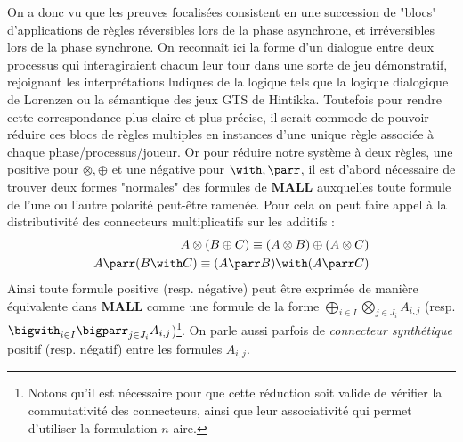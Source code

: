 \documentclass[12pt]{report}
\begin{document}
On a donc vu que les preuves focalisées consistent en une succession de "blocs" d'applications de règles réversibles lors de la phase asynchrone, et irréversibles lors de la phase synchrone. On reconnaît ici la forme d'un dialogue entre deux processus qui interagiraient chacun leur tour dans une sorte de jeu démonstratif, rejoignant les interprétations ludiques de la logique tels que la logique dialogique de Lorenzen ou la sémantique des jeux GTS de Hintikka. Toutefois pour rendre cette correspondance plus claire et plus précise, il serait commode de pouvoir réduire ces blocs de règles multiples en instances d'une unique règle associée à chaque phase/processus/joueur. Or pour réduire notre système à deux règles, une positive pour $\otimes,\oplus$ et une négative pour $\with,\parr$, il est d'abord nécessaire de trouver deux formes "normales" des formules de $\mathbf{MALL}$ auxquelles toute formule de l'une ou l'autre polarité peut-être ramenée. Pour cela on peut faire appel à la distributivité des connecteurs multiplicatifs sur les additifs :
\begin{align}
A \otimes (B \oplus C) \equiv (A \otimes B) \oplus (A \otimes C) \label{eq:dist_pos} \\
A \parr (B \with C) \equiv (A \parr B) \with (A \parr C) \label{eq:dist_neg}
\end{align}
Ainsi toute formule positive (resp. négative) peut être exprimée de manière équivalente dans $\mathbf{MALL}$ comme une formule de la forme $\bigoplus_{i \in I}\bigotimes_{j \in J_i}A_{i,j}$ (resp. $\bigwith_{i \in I}\bigparr_{j \in J_i}A_{i,j}$)\footnote{Notons qu'il est nécessaire pour que cette réduction soit valide de vérifier la commutativité des connecteurs, ainsi que leur associativité qui permet d'utiliser la formulation $n$-aire.}. On parle aussi parfois de \emph{connecteur synthétique} positif (resp. négatif) entre les formules $A_{i,j}$.\\
\end{document}
